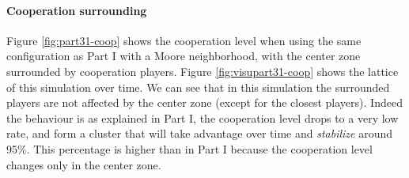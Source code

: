 \documentclass[letterpaper]{article}
\begin{document}
\paragraph{Cooperation surrounding}

Figure \ref{fig:part31-coop} shows
the cooperation level when using the same configuration as Part I
with a Moore neighborhood, with the center zone surrounded
by cooperation players. Figure \ref{fig:visupart31-coop} shows the
lattice of this simulation over time. We can see that in this simulation
the surrounded players are not affected by the center zone (except for the
closest players). Indeed the behaviour is as explained in Part I, the
cooperation level drops to a very low rate, and form a cluster that will
take advantage over time and \textit{stabilize} around 95\%. This percentage
is higher than in Part I because the cooperation level changes only
in the center zone.
\end{document}
